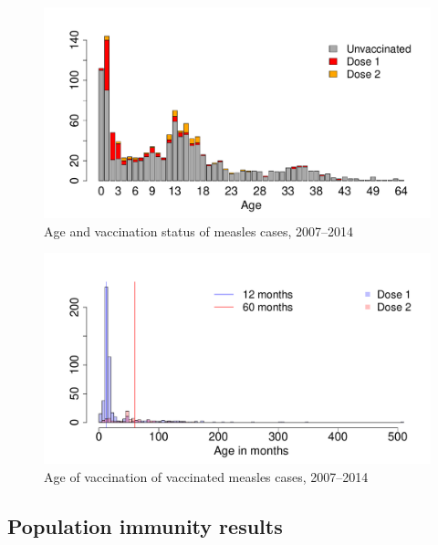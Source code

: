 \documentclass{article}
\begin{document}
\begin{itemize}
\begin{figure}
\begin{center}
\includegraphics{draftfinalreport-020}
\end{center}
\caption{Age and vaccination status of measles cases, 2007--2014}
\label{fig:ageandvac}
\end{figure}

\begin{figure}
\begin{center}
\includegraphics{draftfinalreport-021}
\end{center}
\caption{Age of vaccination of vaccinated measles cases, 2007--2014}
\label{fig:vaccstat}
\end{figure}

\subsection{Population immunity results}


\end{itemize}
\end{document}
